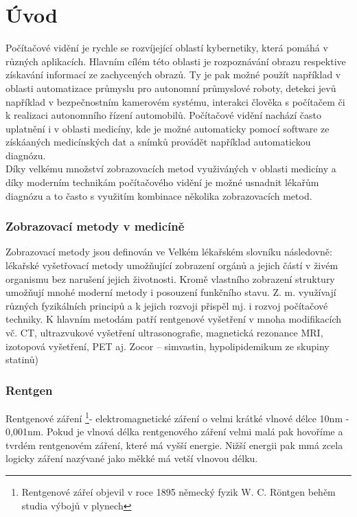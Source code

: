 \documentclass{thesis}%
\begin{document}
%
\tableofcontents
\newpage

\chapter{Úvod}
Počítačové vidění je rychle se rozvíjející oblastí kybernetiky, která pomáhá v různých aplikacích. Hlavním cílém této oblasti je rozpoznávání obrazu respektive získavání informací ze zachycených obrazů.
Ty je pak možné použít například v oblasti automatizace průmyslu pro autonomní průmyslové roboty, detekci jevů například v bezpečnostním kamerovém systému, interakci člověka s počítačem či k realizaci
autonomního řízení automobilů. Počítačové vidění nachází často uplatnění i v oblasti medicíny, kde je možné automaticky pomocí software ze získáaných medicínských dat a snímků provádět například automatickou
diagnózu.\\
Díky velkému množství zobrazovacích metod využiváných v oblasti medicíny a díky moderním technikám počítačového vidění je možné usnadnit lékařům diagnózu a to často s využitím kombinace několika
zobrazovacích metod.\\
\subsection{Zobrazovací metody v medicíně}
Zobrazovací metody jsou definován ve Velkém lékařském slovníku následovně:
lékařské vyšetřovací metody umožňující zobrazení orgánů a jejich částí v živém organismu bez narušení jejich životnosti. Kromě vlastního zobrazení struktury umožňují mnohé moderní metody i posouzení funkčního stavu. Z. m. využívají různých fyzikálních principů a k jejich rozvoji přispěl mj. i rozvoj počítačové techniky. K hlavním metodám patří rentgenové vyšetření v mnoha modifikacích vč. CT, ultrazvukové vyšetření ultrasonografie, magnetická rezonance MRI, izotopová vyšetření, PET aj. Zocor – simvastin, hypolipidemikum ze skupiny statinů)\cite{hugo}\\


\subsection{Rentgen}
Rentgenové záření \footnote[1]{Rentgenové zářeí objevil v roce 1895 německý fyzik W. C. Röntgen behěm studia výbojů v plynech}- elektromagnetické záření o velmi krátké vlnové délce 10nm - 0,001nm. Pokud je vlnová délka rentgenového záření velmi malá pak hovoříme a tvrdém rentgenovém záření, které má vyšší energie. Nižší energii pak mmá zcela logicky záření nazývané jako měkké má vetší vlnovou délku.
\end{document}
